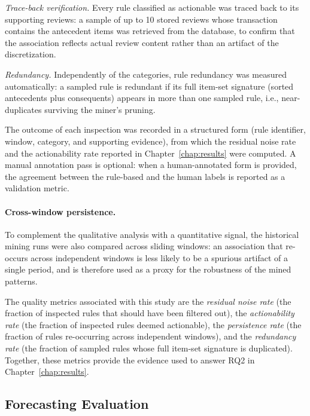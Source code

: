 \emph{Trace-back verification.} Every rule classified as actionable was traced back to its supporting reviews: a sample of up to 10 stored reviews whose transaction contains the antecedent items was retrieved from the database, to confirm that the association reflects actual review content rather than an artifact of the discretization.

\emph{Redundancy.} Independently of the categories, rule redundancy was measured automatically: a sampled rule is redundant if its full item-set signature (sorted antecedents plus consequents) appears in more than one sampled rule, i.e., near-duplicates surviving the miner's pruning.

The outcome of each inspection was recorded in a structured form (rule identifier, window, category, and supporting evidence), from which the residual noise rate and the actionability rate reported in Chapter~\ref{chap:results} were computed. A manual annotation pass is optional: when a human-annotated form is provided, the agreement between the rule-based and the human labels is reported as a validation metric.

\paragraph{Cross-window persistence.} To complement the qualitative analysis with a quantitative signal, the historical mining runs were also compared across sliding windows: an association that re-occurs across independent windows is less likely to be a spurious artifact of a single period, and is therefore used as a proxy for the robustness of the mined patterns.

The quality metrics associated with this study are the \emph{residual noise rate} (the fraction of inspected rules that should have been filtered out), the \emph{actionability rate} (the fraction of inspected rules deemed actionable), the \emph{persistence rate} (the fraction of rules re-occurring across independent windows), and the \emph{redundancy rate} (the fraction of sampled rules whose full item-set signature is duplicated). Together, these metrics provide the evidence used to answer RQ2 in Chapter~\ref{chap:results}.

\subsection{Forecasting Evaluation}
\label{sub:forecasting_evaluation}


